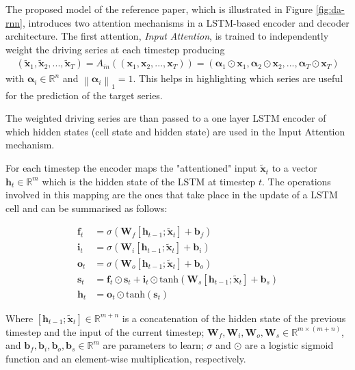 \documentclass{article}
\newcommand{\norm}[1]{\left\lVert#1\right\rVert}
\begin{document}
The proposed model of the reference paper, which is illustrated in Figure
\ref{fig:da-rnn},
introduces two attention mechanisms in a LSTM-based encoder and decoder
architecture.
The first attention, \textit{Input Attention}, is trained to independently
weight
the driving series at each timestep producing
\begin{align*}
(\tilde{\mathbf{x}}_1, \tilde{\mathbf{x}}_2, ..., \tilde{\mathbf{x}}_T) =
A_{in}((\mathbf{x}_1, \mathbf{x}_2, ..., \mathbf{x}_T)) =
(\boldsymbol{\alpha}_1 \odot \mathbf{x}_1, \boldsymbol{\alpha}_2 \odot
\mathbf{x}_2, ..., \boldsymbol{\alpha}_T \odot \mathbf{x}_T)
\end{align*}
with $\boldsymbol{\alpha}_i \in \mathbb{R}^n$ and
$\norm{\boldsymbol{\alpha}_i}_1 = 1$.
This helps in highlighting which series are useful for the prediction of
the target series.

The weighted driving series are than passed to a one layer LSTM encoder of
which hidden states (cell state and hidden state) are used in the Input
Attention
mechanism.

For each timestep the encoder maps the "attentioned" input
$\tilde{\mathbf{x}}_t$ to a vector
$\mathbf{h}_t \in \mathbb{R}^m$ which is the hidden state of
the LSTM at timestep $t$. The operations involved in this mapping are the ones
that take place in the update of a LSTM cell and can be summarised as follows:


\begin{equation} \label{eq:lstm}
\begin{split}
\mathbf{f}_t &= \sigma (\mathbf{W}_f[\mathbf{h}_{t-1};\tilde{\mathbf{x}}_t] +
\mathbf{b}_f) \\
\mathbf{i}_t &= \sigma (\mathbf{W}_i[\mathbf{h}_{t-1};\tilde{\mathbf{x}}_t] +
\mathbf{b}_i) \\
\mathbf{o}_t &= \sigma (\mathbf{W}_o[\mathbf{h}_{t-1};\tilde{\mathbf{x}}_t] +
\mathbf{b}_o) \\
\mathbf{s}_t &= \mathbf{f}_t \odot \mathbf{s}_t + \mathbf{i}_t
				\odot
\text{tanh}(\mathbf{W}_s[\mathbf{h}_{t-1};\tilde{\mathbf{x}}_t] + \mathbf{b}_s)
\\
\mathbf{h}_t &= \mathbf{o}_t \odot \text{tanh}(\mathbf{s}_t)
\end{split}
\end{equation}

Where $[\mathbf{h}_{t-1};\tilde{\mathbf{x}}_t] \in \mathbb{R}^{m + n}$ is a
concatenation of the hidden state of the previous
timestep and the input of the current timestep;
$\mathbf{W}_f,\mathbf{W}_i,\mathbf{W}_o,\mathbf{W}_s
\in \mathbb{R}^{m \times(m+n)}$, and $\mathbf{b}_f, \mathbf{b}_i,
\mathbf{b}_o,\mathbf{b}_s \in \mathbb{R}^m$ are
parameters to learn; $\sigma$ and $\odot$ are a logistic sigmoid function and
an element-wise multiplication,
respectively.
\end{document}
